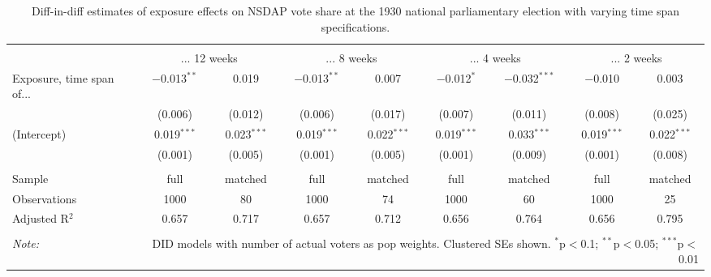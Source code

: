 
\begin{table}[!htbp] \centering 
  \caption{Diff-in-diff estimates of exposure effects on NSDAP vote share at the 1930 national parliamentary election with varying time span specifications.\vspace{-.25cm}} 
  \label{tab:nsdap-voteshare-timespan-dd-1930} 
\scriptsize 
\begin{tabular}{@{\extracolsep{5pt}}lcccccccc} 
\\[-1.8ex]\hline 
\hline \\[-1.8ex] 
 & \multicolumn{2}{c}{... 12 weeks} & \multicolumn{2}{c}{... 8 weeks} & \multicolumn{2}{c}{... 4 weeks} & \multicolumn{2}{c}{... 2 weeks} \\ 
 \cmidrule(r){2-3}\cmidrule(r){4-5}\cmidrule(r){6-7}\cmidrule(r){8-9}Exposure, time span of... & $-$0.013$^{**}$ & 0.019 & $-$0.013$^{**}$ & 0.007 & $-$0.012$^{*}$ & $-$0.032$^{***}$ & $-$0.010 & 0.003 \\ 
  & (0.006) & (0.012) & (0.006) & (0.017) & (0.007) & (0.011) & (0.008) & (0.025) \\ 
  (Intercept) & 0.019$^{***}$ & 0.023$^{***}$ & 0.019$^{***}$ & 0.022$^{***}$ & 0.019$^{***}$ & 0.033$^{***}$ & 0.019$^{***}$ & 0.022$^{***}$ \\ 
  & (0.001) & (0.005) & (0.001) & (0.005) & (0.001) & (0.009) & (0.001) & (0.008) \\ 
 \hline \\[-1.8ex] 
Sample & full & matched & full & matched & full & matched & full & matched \\ 
Observations & 1000 & 80 & 1000 & 74 & 1000 & 60 & 1000 & 25 \\ 
Adjusted R$^{2}$ & 0.657 & 0.717 & 0.657 & 0.712 & 0.656 & 0.764 & 0.656 & 0.795 \\ 
\hline 
\hline \\[-1.8ex] 
\textit{Note:}  & \multicolumn{8}{r}{DID models with number of actual voters as pop weights. Clustered SEs shown. $^{*}$p$<$0.1; $^{**}$p$<$0.05; $^{***}$p$<$0.01} \\ 
\end{tabular} 
\end{table} 
